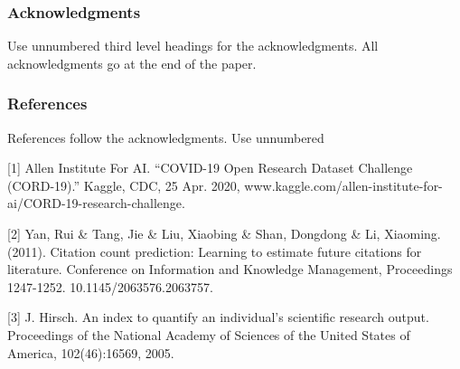 \documentclass{article} %
\begin{document}





\subsubsection*{Acknowledgments}

Use unnumbered third level headings for the acknowledgments. All
acknowledgments go at the end of the paper.

\subsubsection*{References}

References follow the acknowledgments. Use unnumbered 

\small{
[1] Allen Institute For AI. “COVID-19 Open Research Dataset Challenge (CORD-19).” Kaggle, CDC, 25 Apr. 2020, www.kaggle.com/allen-institute-for-ai/CORD-19-research-challenge.

[2] Yan, Rui \& Tang, Jie \& Liu, Xiaobing \& Shan, Dongdong \& Li, Xiaoming. (2011). Citation count prediction: Learning to estimate future citations for literature. {\itInternational Conference on  Information and Knowledge Management, Proceedings} 1247-1252. 10.1145/2063576.2063757. 

[3] J. Hirsch. An index to quantify an individual’s scientific
research output. Proceedings of the National Academy of
Sciences of the United States of America, 102(46):16569,
2005.
}
\end{document}
